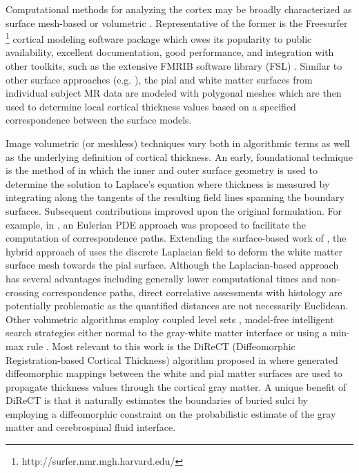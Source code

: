 Computational methods for analyzing the cortex may be 
broadly characterized as surface mesh-based or volumetric \citep{scott2009,clarkson2011}.  Representative of the former is the
Freesurfer%
\footnote{
http://surfer.nmr.mgh.harvard.edu/
}
cortical modeling software package \citep{dale1999,fischl1999,fischl2000,fischl2002,fischl2004}
which owes its popularity to public availability, excellent documentation, 
good performance, and  integration with other toolkits, such as the extensive FMRIB software 
library (FSL) \citep{smith2004}.  Similar to other surface
approaches (e.g. \cite{davatzikos1996,magnotta1999,macdonald2000,kim2005}), the pial
and white matter surfaces from individual subject MR data are modeled with polygonal meshes  
which are then used to determine local cortical thickness values based on a specified correspondence between 
the surface models.

Image volumetric (or meshless) techniques vary both in algorithmic terms as well as
the underlying definition of cortical thickness.  An early, foundational technique is the 
method of \cite{jones2000} in which the inner and outer surface geometry is used to determine the
solution to Laplace's equation where thickness is measured by integrating along the 
tangents of the resulting field lines spanning the boundary surfaces.  Subsequent contributions
improved upon the original formulation.  For example, in \cite{yezzi2003}, an Eulerian PDE approach
was proposed to facilitate the computation of correspondence paths.  Extending the surface-based
work of \cite{macdonald2000}, the hybrid approach of
\cite{kim2005} uses the discrete Laplacian field to deform the white matter surface mesh towards the 
pial surface.    Although the Laplacian-based approach has several advantages
including generally lower computational times and 
non-crossing correspondence paths, direct correlative assessments with histology
are potentially problematic as the quantified distances 
are not necessarily Euclidean.  Other volumetric algorithms employ coupled
level sets \citep{zeng1999}, model-free intelligent search strategies either normal to 
the gray-white matter interface \citep{scott2009} or using a min-max rule \citep{clement-vachet2011}.
Most relevant to this work is the DiReCT (Diffeomorphic Registration-based 
Cortical Thickness) algorithm proposed in \cite{das2009} where generated
diffeomorphic mappings between the 
white and pial matter surfaces are used to propagate thickness values 
through the cortical gray matter.  A unique benefit of DiReCT is that it
naturally estimates the boundaries of buried sulci by employing a
diffeomorphic constraint on the probabilistic estimate of the gray
matter and cerebrospinal fluid interface.  

